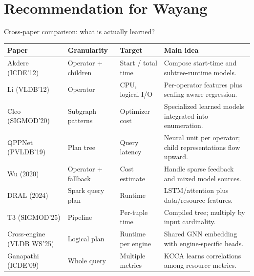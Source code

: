 \documentclass[aspectratio=169,10pt]{beamer}
\begin{document}
\section{Recommendation for Wayang}
\begin{frame}[shrink=10]{Cross-paper comparison: what is actually learned?}
\footnotesize
\begin{tabularx}{\textwidth}{@{}p{2.5cm}p{2.3cm}p{2.1cm}X@{}}
\toprule
\textbf{Paper} & \textbf{Granularity} & \textbf{Target} & \textbf{Main idea} \\
\midrule
Akdere (ICDE'12) & Operator + children & Start / total time & Compose start-time and subtree-runtime models. \\
Li (VLDB'12) & Operator & CPU, logical I/O & Per-operator features plus scaling-aware regression. \\
Cleo (SIGMOD'20) & Subgraph patterns & Optimizer cost & Specialized learned models integrated into enumeration. \\
QPPNet (PVLDB'19) & Plan tree & Query latency & Neural unit per operator; child representations flow upward. \\
Wu (2020) & Operator + fallback & Cost estimate & Handle sparse feedback and mixed model sources. \\
DRAL (2024) & Spark query plan & Runtime & LSTM/attention plus data/resource features. \\
T3 (SIGMOD'25) & Pipeline & Per-tuple time & Compiled tree; multiply by input cardinality. \\
Cross-engine (VLDB WS'25) & Logical plan & Runtime per engine & Shared GNN embedding with engine-specific heads. \\
Ganapathi (ICDE'09) & Whole query & Multiple metrics & KCCA learns correlations among resource metrics. \\
\bottomrule
\end{tabularx}
\end{frame}
\end{document}
